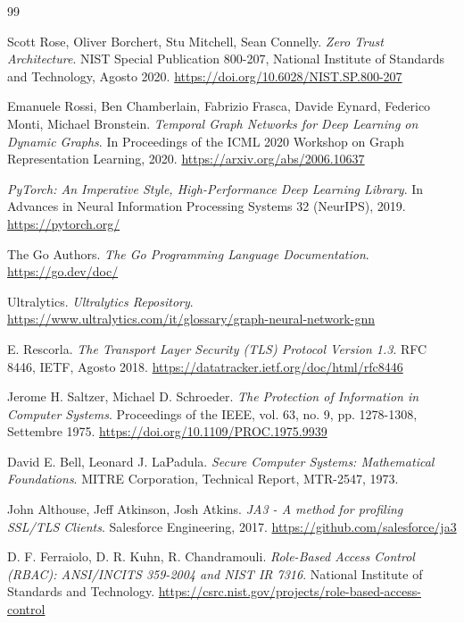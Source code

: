 \clearpage
{}
{}
\begin{thebibliography}{99}

Scott Rose, Oliver Borchert, Stu Mitchell, Sean Connelly.
\textit{Zero Trust Architecture}.
NIST Special Publication 800-207, National Institute of Standards and Technology, Agosto 2020.
\url{https://doi.org/10.6028/NIST.SP.800-207}

Emanuele Rossi, Ben Chamberlain, Fabrizio Frasca, Davide Eynard, Federico Monti, Michael Bronstein.
\textit{Temporal Graph Networks for Deep Learning on Dynamic Graphs}.
In Proceedings of the ICML 2020 Workshop on Graph Representation Learning, 2020.
\url{https://arxiv.org/abs/2006.10637}

\textit{PyTorch: An Imperative Style, High-Performance Deep Learning Library}.
In Advances in Neural Information Processing Systems 32 (NeurIPS), 2019.
\url{https://pytorch.org/}

The Go Authors.
\textit{The Go Programming Language Documentation}.
\url{https://go.dev/doc/}

Ultralytics.
\textit{Ultralytics Repository}.
\url{https://www.ultralytics.com/it/glossary/graph-neural-network-gnn}

E. Rescorla.
\textit{The Transport Layer Security (TLS) Protocol Version 1.3}.
RFC 8446, IETF, Agosto 2018.
\url{https://datatracker.ietf.org/doc/html/rfc8446}

Jerome H. Saltzer, Michael D. Schroeder.
\textit{The Protection of Information in Computer Systems}.
Proceedings of the IEEE, vol. 63, no. 9, pp. 1278-1308, Settembre 1975.
\url{https://doi.org/10.1109/PROC.1975.9939}

David E. Bell, Leonard J. LaPadula.
\textit{Secure Computer Systems: Mathematical Foundations}.
MITRE Corporation, Technical Report, MTR-2547, 1973.

John Althouse, Jeff Atkinson, Josh Atkins.
\textit{JA3 - A method for profiling SSL/TLS Clients}.
Salesforce Engineering, 2017.
\url{https://github.com/salesforce/ja3}

D. F. Ferraiolo, D. R. Kuhn, R. Chandramouli.
\textit{Role-Based Access Control (RBAC): ANSI/INCITS 359-2004 and NIST IR 7316}.
National Institute of Standards and Technology.
\url{https://csrc.nist.gov/projects/role-based-access-control}


\end{thebibliography}

